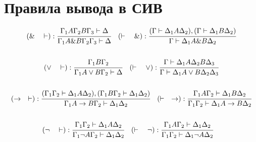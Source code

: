 \documentclass[main]{subfiles}
\begin{document}
\section{Правила вывода в СИВ}
\begin{gather*}
    (\& \quad \vdash): 
    \cfrac{\Gamma_1A\Gamma_2 B\Gamma_3 \vdash \Delta}
    {\Gamma_1 A \& B \Gamma_2 \Gamma_3 \vdash \Delta}\quad
    (\vdash \quad \&): \cfrac{(\Gamma\vdash \Delta_1A\Delta_2), 
    (\Gamma \vdash \Delta_1 B\Delta_2)}{\Gamma \vdash \Delta_1 A \& B \Delta_2}
    \\
    \\
    (\lor \quad \vdash):
    \cfrac{\Gamma_1 B\Gamma_2}{\Gamma_1 A\lor B\Gamma_2 \vdash \Delta}\quad
    (\vdash \quad \lor):
    \cfrac{\Gamma \vdash \Delta_1A\Delta_2B\Delta_3}
    {\Gamma \vdash \Delta_1 A\lor B\Delta_2\Delta_3}
    \\
    \\
    (\to \quad \vdash):
    \cfrac{(\Gamma_1\Gamma_2\vdash\Delta_1A\Delta_2), 
    (\Gamma_1B\Gamma_2\vdash\Delta_1\Delta_2)}
    {\Gamma_1 A\to B\Gamma_2 \vdash \Delta_1 \Delta_2}\quad
    (\vdash \quad \to):
    \cfrac{\Gamma_1A\Gamma_2 \vdash \Delta_1B\Delta_2}
    {\Gamma_1\Gamma_2 \vdash \Delta_1A\to B \Delta_2}
    \\
    \\
    (\lnot\quad \vdash):
    \cfrac{\Gamma_1 \Gamma_2 \vdash \Delta_1A\Delta_2}
    {\Gamma_1 \lnot A\Gamma_2 \vdash \Delta_1\Delta_2}\quad
    (\vdash \quad \lnot):
    \cfrac{\Gamma_1 A\Gamma_2 \vdash \Delta_1\Delta_2}
    {\Gamma_1 \Gamma_2 \vdash \Delta_1\lnot A\Delta_2}\quad
\end{gather*}
\end{document}
